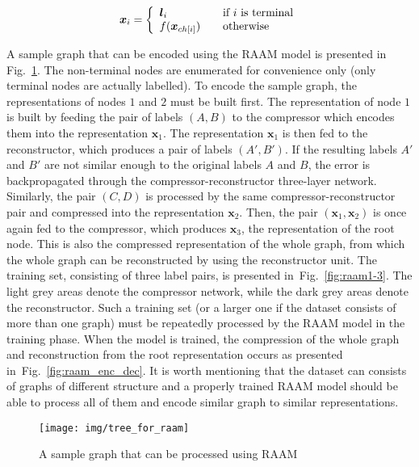 \documentclass[]{spie}  %
\newcommand{\bm}[1]{\boldsymbol{#1}}
\begin{document}
\begin{equation}
\bm{x}_i = \left\{
\begin{array}{l l}
	\bm{l}_i & \quad \text{if $i$ is terminal} \\
	f(\bm{x}_{ch[i]}) & \quad \text{otherwise}
\end{array}
\right.
\label{eq:raam_representation}
\end{equation}

A sample graph that can be encoded using the RAAM model is presented in Fig.~\ref{fig:tree_for_raam}. The non-terminal nodes are enumerated for convenience only (only terminal nodes are actually labelled). To encode the sample graph, the representations of nodes $1$ and $2$ must be built first. The representation of node $1$ is built by feeding the pair of labels $(A, B)$ to the compressor which encodes them into the representation $\bm{x}_1$. The representation $\bm{x}_1$ is then fed to the reconstructor, which produces a pair of labels $(A', B')$. If the resulting labels $A'$ and $B'$ are not similar enough to the original labels $A$ and $B$, the error is backpropagated through the compressor-reconstructor three-layer network. Similarly, the pair $(C, D)$ is processed by the same compressor-reconstructor pair and compressed into the representation $\bm{x}_2$. Then, the pair $(\bm{x}_1, \bm{x}_2)$ is once again fed to the compressor, which produces $\bm{x}_3$, the representation of the root node. This is also the compressed representation of the whole graph, from which the whole graph can be reconstructed by using the reconstructor unit. The training set, consisting of three label pairs, is presented in~Fig.~\ref{fig:raam1-3}. The light grey areas denote the compressor network, while the dark grey areas denote the reconstructor. Such a training set (or a larger one if the dataset consists of more than one graph) must be repeatedly processed by the RAAM model in the training phase. When the model is trained, the compression of the whole graph and reconstruction from the root representation occurs as presented in~Fig.~\ref{fig:raam_enc_dec}. It is worth mentioning that the dataset can consists of graphs of different structure and a properly trained RAAM model should be able to process all of them and encode similar graph to similar representations.

\begin{figure}
\begin{center}
	\texttt{[image: img/tree\_for\_raam]}
	\caption{A sample graph that can be processed using RAAM}
	\label{fig:tree_for_raam}
\end{center}
\end{figure}
\end{document}
